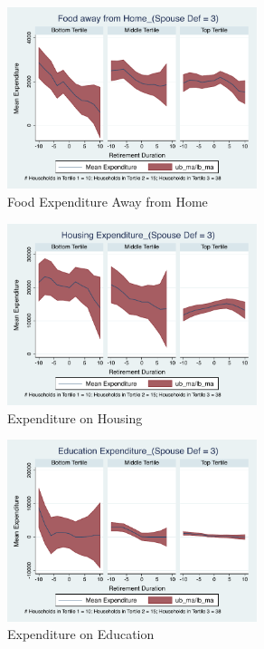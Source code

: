 \documentclass[11pt,onecolumn]{article}
\numberwithin{figure}{section}
\begin{document}
\begin{figure}[h]
	\caption{Food Expenditure Away from Home}
	\centering
	\includegraphics[width=0.65\textwidth]{../ConsumptionPostRetirement_by_SpouseDef_Cats/Smoothed/3/spouse_def_total_foodexp_away_real.pdf}
\end{figure}

\clearpage

\begin{figure}[h]
	\caption{Expenditure on Housing}
	\centering
	\includegraphics[width=0.65\textwidth]{../ConsumptionPostRetirement_by_SpouseDef_Cats/Smoothed/3/spouse_def_total_housing_real.pdf}
\end{figure}


\begin{figure}[h]
	\caption{Expenditure on Education}
	\centering
	\includegraphics[width=0.65\textwidth]{../ConsumptionPostRetirement_by_SpouseDef_Cats/Smoothed/3/spouse_def_total_education_real.pdf}
\end{figure}
\clearpage
\end{document}
